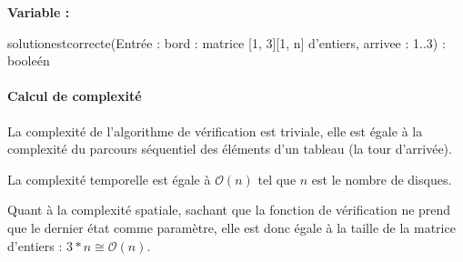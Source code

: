 \begin{function}[H]
    \textbf{Variable :}\\
    \caption{solutionestcorrecte(Entrée : bord : matrice {[1, 3]}{[1, n]} d'entiers, arrivee : 1..3) : booleén}
\end{function}

\paragraph{Calcul de complexité}
La complexité de l'algorithme de vérification est triviale, elle est égale à la complexité du parcours séquentiel des éléments d'un tableau (la tour d'arrivée).
\par
La complexité temporelle est égale à $\mathcal{O}(n)$ tel que $n$ est le nombre de disques.
\par
Quant à la complexité spatiale, sachant que la fonction de vérification ne prend que le dernier état comme paramètre, elle est donc égale à la taille de la matrice d'entiers : $3 * n \cong \mathcal{O}(n)$.

